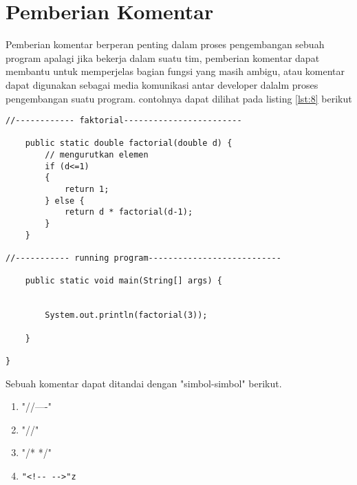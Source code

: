 \section{Pemberian Komentar}
\par 
Pemberian komentar berperan penting dalam proses pengembangan sebuah program apalagi jika bekerja dalam suatu tim, pemberian komentar dapat membantu untuk memperjelas bagian fungsi yang masih ambigu, atau komentar dapat digunakan sebagai media komunikasi antar developer dalalm proses pengembangan suatu program. contohnya dapat dilihat pada listing \ref{lst:8} berikut

\begin{lstlisting}[caption=Contoh commit standar,label={lst:8}]
//------------ faktorial------------------------
	
	public static double factorial(double d) {
		// mengurutkan elemen
		if (d<=1)
		{
			return 1;
		} else {
			return d * factorial(d-1);
		}
	}
	
//----------- running program---------------------------
	
	public static void main(String[] args) {
	
		
		System.out.println(factorial(3));
		
	}

}
\end{lstlisting}
\par 
Sebuah komentar dapat ditandai dengan "simbol-simbol" berikut.
\begin{enumerate}
\item "//----"
\item "//"
\item "/* */"
\item 
\begin{verbatim}
"<!-- -->"z
\end{verbatim}

\end{enumerate}
